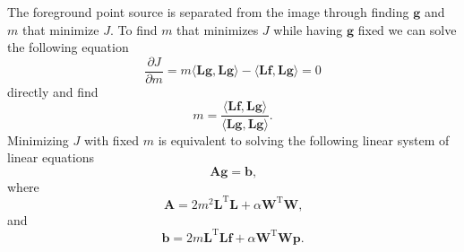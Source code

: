 \documentclass{article}
\newcommand{\vect}[1]{\mathbf{#1}}
\newcommand{\trans}[1]{\mathbf{#1}^\mathrm{T}}
\begin{document}
The foreground point source is separated from the image through finding $\vect{g}$ and $m$ that minimize $J$.
To find $m$ that minimizes $J$ while having $\vect{g}$ fixed we can solve the following equation
\begin{equation}
\frac{\partial J}{\partial m} = m\langle \vect{L}\vect{g}, \vect{L}\vect{g}\rangle - \langle \vect{L}\vect{f}, \vect{L}\vect{g}\rangle = 0
\end{equation}
directly and find
\begin{equation}
m = \frac{\langle \vect{L}\vect{f}, \vect{L}\vect{g}\rangle}{\langle \vect{L}\vect{g}, \vect{L}\vect{g}\rangle}\text{.}
\end{equation}
Minimizing $J$ with fixed $m$ is equivalent to solving the following linear system of linear equations
\begin{equation}
\vect{A}\vect{g} = \vect{b}\text{,}
\end{equation}
where
\begin{equation}
\vect{A} = 2 m^2 \trans{L}\vect{L} + \alpha \trans{W}\vect{W}\text{,}
\end{equation}
and
\begin{equation}
\vect{b} = 2 m \trans{L}\vect{L}\vect{f} + \alpha \trans{W}\vect{W}\vect{p}\text{.}
\end{equation}
\end{document}
